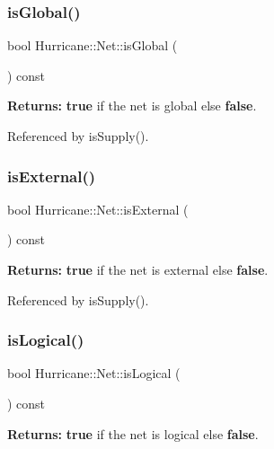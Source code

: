 \subsubsection{\texorpdfstring{is\+Global()}{isGlobal()}}
{\footnotesize\ttfamily bool Hurricane\+::\+Net\+::is\+Global (\begin{DoxyParamCaption}{ }\end{DoxyParamCaption}) const\hspace{0.3cm}{\ttfamily [inline]}}

{\bfseries Returns\+:} {\bfseries true} if the net is global else {\bfseries false}. 

Referenced by is\+Supply().

\mbox{\label{classHurricane_1_1Net_aeeb3735dd7451bc0054dd68ac21aae47}} 
\subsubsection{\texorpdfstring{is\+External()}{isExternal()}}
{\footnotesize\ttfamily bool Hurricane\+::\+Net\+::is\+External (\begin{DoxyParamCaption}{ }\end{DoxyParamCaption}) const\hspace{0.3cm}{\ttfamily [inline]}}

{\bfseries Returns\+:} {\bfseries true} if the net is external else {\bfseries false}. 

Referenced by is\+Supply().

\mbox{\label{classHurricane_1_1Net_a9caf25bfa84478157d206979dd521ed4}} 
\subsubsection{\texorpdfstring{is\+Logical()}{isLogical()}}
{\footnotesize\ttfamily bool Hurricane\+::\+Net\+::is\+Logical (\begin{DoxyParamCaption}{ }\end{DoxyParamCaption}) const\hspace{0.3cm}{\ttfamily [inline]}}

{\bfseries Returns\+:} {\bfseries true} if the net is logical else {\bfseries false}. 

